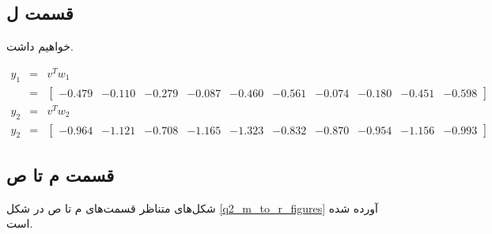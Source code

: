 \documentclass{article}
\begin{document}
\subsection*{قسمت ل}

خواهیم داشت.

\begin{eqnarray*}
    y_1 & = & v^Tw_1 \\
    & = &  \begin{bmatrix}-0.479 & -0.110 & -0.279 & -0.087 & -0.460 & -0.561 & -0.074 & -0.180 & -0.451 & -0.598 \end{bmatrix} \\
    y_2 & = & v^Tw_2 \\
    y_2 & = & \begin{bmatrix}-0.964 & -1.121 & -0.708 & -1.165 & -1.323 & -0.832 & -0.870 & -0.954 & -1.156 & -0.993 \end{bmatrix}
\end{eqnarray*}

\subsection*{قسمت م تا ص}

شکل‌های متناظر قسمت‌های م تا ص در شکل \ref{q2_m_to_r_figures} آورده شده است.
\end{document}

